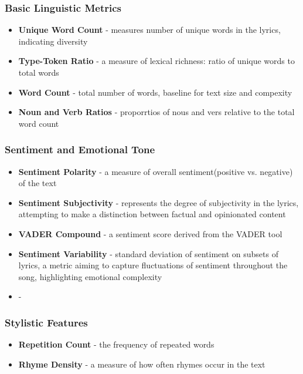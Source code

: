 \subsubsection*{Basic Linguistic Metrics}
\begin{itemize}
  \item \textbf{Unique Word Count} - measures number of unique words in the lyrics, indicating diversity
  \item \textbf{Type-Token Ratio} - a measure of lexical richness: ratio of unique words to total words
  \item \textbf{Word Count} - total  number of words, baseline for text size and compexity
  \item \textbf{Noun and Verb Ratios} - proporrtios of nous and vers relative to the total word count
\end{itemize}


\subsubsection*{Sentiment and Emotional Tone}
\begin{itemize}
  \item \textbf{Sentiment Polarity} - a measure of overall sentiment(positive
    vs. negative) of the text
  \item \textbf{Sentiment Subjectivity} - represents the degree of subjectivity
    in the lyrics, attempting to make a distinction between factual and
    opinionated content
  \item \textbf{VADER Compound} - a sentiment score derived from the VADER tool
  \item \textbf{Sentiment Variability} - standard deviation of sentiment on
    subsets of lyrics, a metric  aiming to capture fluctuations of sentiment
    throughout the song, highlighting emotional complexity
  \item \textbf{} -
\end{itemize}


\subsubsection*{Stylistic Features}
\begin{itemize}
  \item \textbf{Repetition Count} - the frequency of repeated words
  \item \textbf{Rhyme Density} - a measure of how often rhymes occur in the
    text
\end{itemize}


